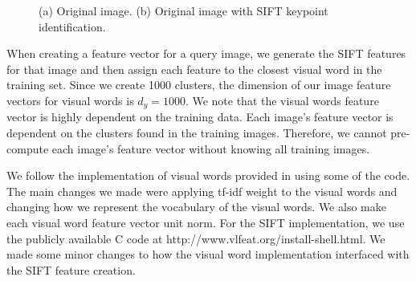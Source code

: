 \begin{figure}
  \centering
  \caption{(a) Original image. (b) Original image with SIFT keypoint identification.}
  \label{fig:chpt9:sift}
\end{figure}

When creating a feature vector for a query image, we generate the SIFT features for that
image and then assign each feature to the closest visual word in the training set. Since
we create 1000 clusters, the dimension of our image feature vectors for visual words is
$d_y=1000$. We note that the visual words feature vector is highly dependent on the
training data. Each image's feature vector is dependent on the clusters found in the
training images. Therefore, we cannot pre-compute each image's feature vector without
knowing all training images.

We follow the implementation of visual words provided in \cite{solem2012programming} using
some of the code. The main changes we made were applying tf-idf weight to the visual words
and changing how we represent the vocabulary of the visual words. We also make each visual word
feature vector unit norm. For the SIFT implementation, we
use the publicly available C code at {\small{http://www.vlfeat.org/install-shell.html}}. We
made some minor changes to how the visual word implementation interfaced with the SIFT
feature creation. 

